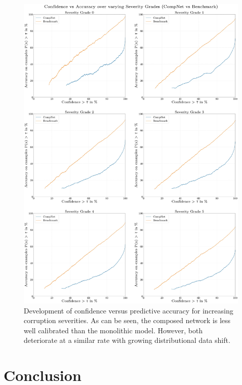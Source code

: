 \begin{figure}[htb]
    \centering
	    \includegraphics[width=\textwidth]{thesis/graphics/diagrams/uncertainty/uncertainty_compnet_benchmark_ds_confidence_accuracy_print.jpg}
    \caption{Development of confidence versus predictive accuracy for increasing corruption severities. As can be seen, the composed network is less well calibrated than the monolithic model. However, both deteriorate at a similar rate with growing distributional data shift.}
    \label{fig:experiments_uncertainty_results_ds_confidence_accuracy}
\end{figure}

\cleardoublepage

\section{Conclusion%
         \label{sec:conclusion}}

